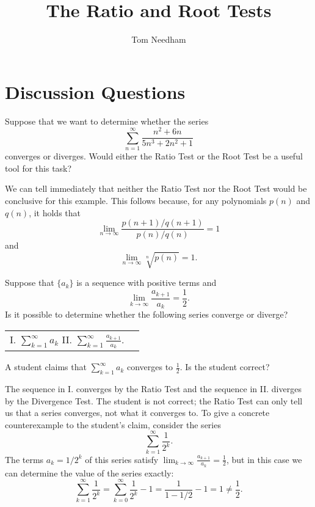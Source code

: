 \documentclass[]{ximera}
\author{Tom Needham}
\title[]{The Ratio and Root Tests}
\begin{document}
\begin{abstract}
\end{abstract}
\maketitle

\vspace{-0.5in}

\section{Discussion Questions}

\begin{problem}
Suppose that we want to determine whether the series
$$
\sum_{n=1}^\infty \frac{n^2+6n}{5n^3 + 2n^2 + 1}
$$
converges or diverges. Would either the Ratio Test or the Root Test be a useful tool for this task?

\begin{freeResponse}
We can tell immediately that neither the Ratio Test nor the Root Test would be conclusive for this example. This follows because, for any polynomials $p(n)$ and $q(n)$, it holds that
$$
\lim_{n\rightarrow \infty} \frac{p(n+1)/q(n+1)}{p(n)/q(n)} = 1
$$
and 
$$
\lim_{n\rightarrow \infty} \sqrt[n]{p(n)} = 1.
$$
\end{freeResponse}
\end{problem}

\begin{problem}
Suppose that $\{a_k\}$ is a sequence with positive terms and 
$$
\lim_{k \rightarrow \infty} \frac{a_{k+1}}{a_k} = \frac{1}{2}.
$$
Is it possible to determine whether the following series converge or diverge?
\begin{center}
\begin{tabular}{ll}
I. $\sum_{k=1}^\infty a_k$ \hspace{1in} II. $\sum_{k=1}^\infty \frac{a_{k+1}}{a_k}$.
\end{tabular}
\end{center}
A student claims that $\sum_{k=1}^\infty a_k$ converges to $\frac{1}{2}$. Is the student correct?

\begin{freeResponse}
The sequence in I. converges by the Ratio Test and the sequence in II. diverges by the Divergence Test. The student is not correct; the Ratio Test can only tell us that a series converges, not what it converges to. To give a concrete counterexample to the student's claim, consider the series 
$$
\sum_{k=1}^\infty \frac{1}{2^k}.
$$
The terms $a_k = 1/2^k$ of this series satisfy $\lim_{k \rightarrow \infty} \frac{a_{k+1}}{a_k} = \frac{1}{2}$, but in this case we can determine the value of the series exactly:
$$
\sum_{k=1}^\infty \frac{1}{2^k} = \sum_{k=0}^\infty \frac{1}{2^k} - 1 = \frac{1}{1-1/2} - 1 = 1 \neq \frac{1}{2}.
$$
\end{freeResponse}
\end{problem}
\end{document}
